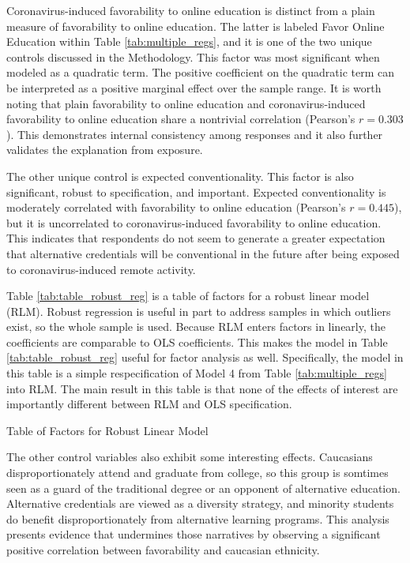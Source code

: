 \documentclass[review]{elsarticle}
\begin{document}
Coronavirus-induced favorability to online education is distinct from a plain measure of favorability to online education.
The latter is labeled Favor Online Education within Table \ref{tab:multiple_regs},
and it is one of the two unique controls discussed in the Methodology.
This factor was most significant when modeled as a quadratic term.
The positive coefficient on the quadratic term can be interpreted as a positive marginal effect over the sample range.
It is worth noting that plain favorability to online education
and coronavirus-induced favorability to online education share a nontrivial correlation (Pearson's $r=0.303$).
This demonstrates internal consistency among responses and it also further validates the explanation from exposure.

The other unique control is expected conventionality.
This factor is also significant, robust to specification, and important.
Expected conventionality is moderately correlated with favorability to online education (Pearson's $r=0.445$),
but it is uncorrelated to coronavirus-induced favorability to online education.
This indicates that respondents do not seem to generate a greater expectation that alternative credentials will be conventional in the future
after being exposed to coronavirus-induced remote activity.

Table \ref{tab:table_robust_reg} is a table of factors for a robust linear model (RLM).
Robust regression is useful in part to address samples in which outliers exist, so the whole sample is used.
Because RLM enters factors in linearly, the coefficients are comparable to OLS coefficients.
This makes the model in Table \ref{tab:table_robust_reg} useful for factor analysis as well.
Specifically, the model in this table is a simple respecification of Model 4 from Table \ref{tab:multiple_regs} into RLM.
The main result in this table is that none of the effects of interest are importantly different between RLM and OLS specification.

\begin{table}
    \caption{Table of Factors for Robust Linear Model}
    \resizebox{\columnwidth}{!}{
        
    }
    \label{tab:table_robust_reg}
\end{table}

The other control variables also exhibit some interesting effects.
Caucasians disproportionately attend and graduate from college,
so this group is somtimes seen as a guard of the traditional degree or an opponent of alternative education. %
Alternative credentials are viewed as a diversity strategy,
and minority students do benefit disproportionately from alternative learning programs. %
This analysis presents evidence that undermines those narratives by observing a significant positive correlation between favorability and caucasian ethnicity.
\end{document}
